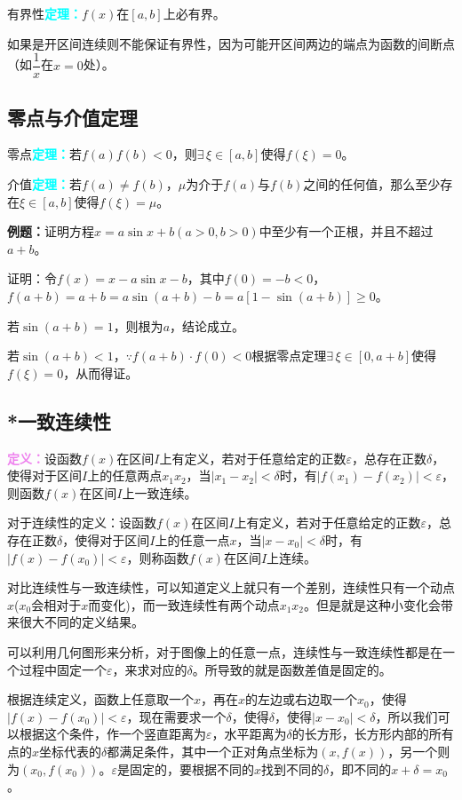 \documentclass[UTF8, 12pt]{ctexart}
\begin{document}
有界性\textcolor{aqua}{\textbf{定理：}}$f(x)$在$[a,b]$上必有界。

如果是开区间连续则不能保证有界性，因为可能开区间两边的端点为函数的间断点（如$\dfrac{1}{x}$在$x=0$处）。

\subsection{零点与介值定理}

零点\textcolor{aqua}{\textbf{定理：}}若$f(a)f(b)<0$，则$\exists\,\xi\in[a,b]$使得$f(\xi)=0$。

介值\textcolor{aqua}{\textbf{定理：}}若$f(a)\neq f(b)$，$\mu$为介于$f(a)$与$f(b)$之间的任何值，那么至少存在$\xi\in[a,b]$使得$f(\xi)=\mu$。

\textbf{例题：}证明方程$x=a\sin x+b(a>0,b>0)$中至少有一个正根，并且不超过$a+b$。

证明：令$f(x)=x-a\sin x-b$，其中$f(0)=-b<0$，$f(a+b)=a+b=a\sin(a+b)-b=a[1-\sin(a+b)]\geqslant 0$。

若$\sin(a+b)=1$，则根为$a$，结论成立。

若$\sin(a+b)<1$，$\because f(a+b)\cdot f(0)<0$根据零点定理$\exists\,\xi\in[0,a+b]$使得$f(\xi)=0$，从而得证。

\subsection{*一致连续性}

\textcolor{violet}{\textbf{定义：}}设函数$f(x)$在区间$I$上有定义，若对于任意给定的正数$\varepsilon$，总存在正数$\delta$，使得对于区间$I$上的任意两点$x_1x_2$，当$\vert x_1-x_2\vert<\delta$时，有$\vert f(x_1)-f(x_2)\vert<\varepsilon$，则函数$f(x)$在区间$I$上一致连续。

对于连续性的定义：设函数$f(x)$在区间$I$上有定义，若对于任意给定的正数$\varepsilon$，总存在正数$\delta$，使得对于区间$I$上的任意一点$x$，当$\vert x-x_0\vert<\delta$时，有$\vert f(x)-f(x_0)\vert<\varepsilon$，则称函数$f(x)$在区间$I$上连续。

对比连续性与一致连续性，可以知道定义上就只有一个差别，连续性只有一个动点$x$($x_0$会相对于$x$而变化)，而一致连续性有两个动点$x_1x_2$。但是就是这种小变化会带来很大不同的定义结果。

可以利用几何图形来分析，对于图像上的任意一点，连续性与一致连续性都是在一个过程中固定一个$\varepsilon$，来求对应的$\delta$。所导致的就是函数差值是固定的。

根据连续定义，函数上任意取一个$x$，再在$x$的左边或右边取一个$x_0$，使得$\vert f(x)-f(x_0)\vert<\varepsilon$，现在需要求一个$\delta$，使得$\delta$，使得$\vert x-x_0\vert<\delta$，所以我们可以根据这个条件，作一个竖直距离为$\varepsilon$，水平距离为$\delta$的长方形，长方形内部的所有点的$x$坐标代表的$\delta$都满足条件，其中一个正对角点坐标为$(x,f(x))$，另一个则为$(x_0,f(x_0))$。$\varepsilon$是固定的，要根据不同的$x$找到不同的$\delta$，即不同的$x+\delta=x_0$。
\end{document}
